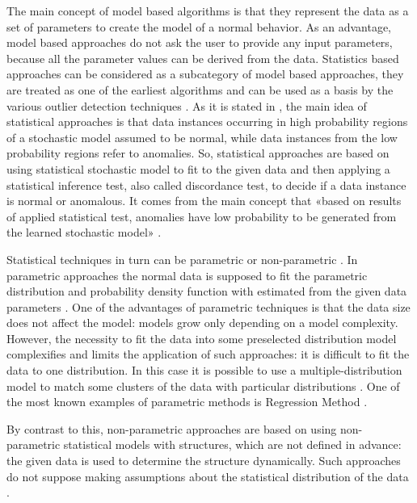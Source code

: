 The main concept of model based algorithms is that they represent the data as a set of parameters to create the model of a normal behavior. As an advantage, model based approaches do not ask the user to provide any input parameters, because all the parameter values can be derived from the data. Statistics based approaches can be considered as a subcategory of model based approaches, they are treated as one of the earliest algorithms and can be used as a basis by the various outlier detection techniques \cite{article:comp_analys_odt}. As it is stated in \cite{article:15_survey_ad}, the main idea of statistical approaches is that data instances occurring in high probability regions of a stochastic model assumed to be normal, while data instances from the low probability regions refer to anomalies. So, statistical approaches are based on using statistical stochastic model to fit to the given data and then applying a statistical inference test, also called discordance test, to decide if a data instance is normal or anomalous. It comes from the main concept that «based on results of applied statistical test, anomalies have low probability to be generated from the learned stochastic model» \cite{article:15_survey_ad}.

Statistical techniques in turn can be parametric or non-parametric \cite{article:comp_analys_odt}. In parametric approaches the normal data is supposed to fit the parametric distribution and probability density function with estimated from the given data parameters \cite{article:6_survey_anom_det_rtuvs}. One of the advantages of parametric techniques is that the data size does not affect the model: models grow only depending on a model complexity. However, the necessity to fit the data into some preselected distribution model complexifies and limits the application of such approaches: it is difficult to fit the data to one distribution. In this case it is possible to use a multiple-distribution model to match some clusters of the data with particular distributions \cite{inproceedings:18_ardod_lstd}. One of the most known examples of parametric methods is Regression Method \cite{article:comp_analys_odt}.

By contrast to this, non-parametric approaches are based on using non-parametric statistical models with structures, which are not defined in advance: the given data is used to determine the structure dynamically. Such approaches do not suppose making assumptions about the statistical distribution of the data \cite{article:comp_analys_odt}.

